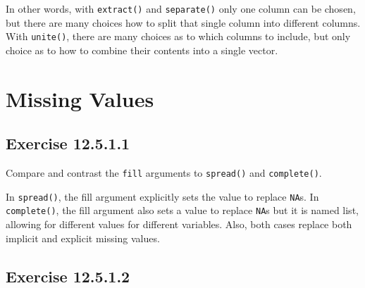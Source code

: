 \documentclass[]{book}
\newenvironment{Shaded}{\begin{snugshade}}{\end{snugshade}}
\newcommand{\CommentTok}[1]{\textcolor[rgb]{0.56,0.35,0.01}{\textit{#1}}}
\newcommand{\DataTypeTok}[1]{\textcolor[rgb]{0.13,0.29,0.53}{#1}}
\newcommand{\DecValTok}[1]{\textcolor[rgb]{0.00,0.00,0.81}{#1}}
\newcommand{\KeywordTok}[1]{\textcolor[rgb]{0.13,0.29,0.53}{\textbf{#1}}}
\newcommand{\NormalTok}[1]{#1}
\newcommand{\OperatorTok}[1]{\textcolor[rgb]{0.81,0.36,0.00}{\textbf{#1}}}
\newcommand{\StringTok}[1]{\textcolor[rgb]{0.31,0.60,0.02}{#1}}
\theoremstyle{plain}
\theoremstyle{remark}
\begin{document}
\begin{Shaded}
\end{Shaded}

In other words, with \texttt{extract()} and \texttt{separate()} only one
column can be chosen, but there are many choices how to split that
single column into different columns. With \texttt{unite()}, there are
many choices as to which columns to include, but only choice as to how
to combine their contents into a single vector.

\hypertarget{missing-values-1}{%
\section{Missing Values}\label{missing-values-1}}

\hypertarget{exercise-12.5.1.1}{%
\subsection*{\texorpdfstring{Exercise
{12.5.1.1}}{Exercise 12.5.1.1}}\label{exercise-12.5.1.1}}

Compare and contrast the \texttt{fill} arguments to \texttt{spread()}
and \texttt{complete()}.

In \texttt{spread()}, the fill argument explicitly sets the value to
replace \texttt{NA}s. In \texttt{complete()}, the fill argument also
sets a value to replace \texttt{NA}s but it is named list, allowing for
different values for different variables. Also, both cases replace both
implicit and explicit missing values.

\hypertarget{exercise-12.5.1.2}{%
\subsection*{\texorpdfstring{Exercise
{12.5.1.2}}{Exercise 12.5.1.2}}\label{exercise-12.5.1.2}}
\end{document}
